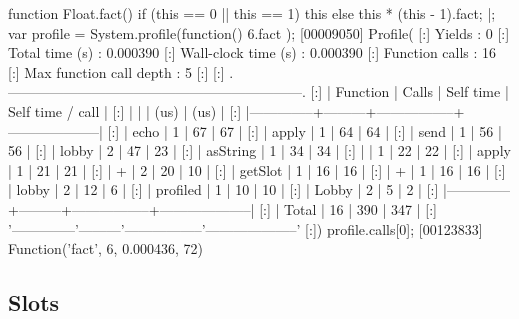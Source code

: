 \begin{urbiscript}
function Float.fact()
{
  if (this == 0 || this == 1)
    this
  else
    this * (this - 1).fact;
}|;
var profile = System.profile(function() { 6.fact });
[00009050] Profile(
[:]  Yields                   : 0
[:]  Total time (s)           : 0.000390
[:]  Wall-clock time (s)      : 0.000390
[:]  Function calls           : 16
[:]  Max function call depth  : 5
[:]
[:]  .---------------------------------------------------------------.
[:]  |   Function   |  Calls  |    Self time    |  Self time / call  |
[:]  |              |         |       (us)      |        (us)        |
[:]  |--------------+---------+-----------------+--------------------|
[:]  |         echo |       1 |              67 |                 67 |
[:]  |        apply |       1 |              64 |                 64 |
[:]  |         send |       1 |              56 |                 56 |
[:]  |        lobby |       2 |              47 |                 23 |
[:]  |     asString |       1 |              34 |                 34 |
[:]  |              |       1 |              22 |                 22 |
[:]  |        apply |       1 |              21 |                 21 |
[:]  |            + |       2 |              20 |                 10 |
[:]  |      getSlot |       1 |              16 |                 16 |
[:]  |            + |       1 |              16 |                 16 |
[:]  |        lobby |       2 |              12 |                  6 |
[:]  |     profiled |       1 |              10 |                 10 |
[:]  |        Lobby |       2 |               5 |                  2 |
[:]  |--------------+---------+-----------------+--------------------|
[:]  |        Total |      16 |             390 |                347 |
[:]  '--------------'---------'-----------------'--------------------'
[:])
profile.calls[0];
[00123833] Function('fact', 6, 0.000436, 72)
\end{urbiscript}

\subsection{Slots}

